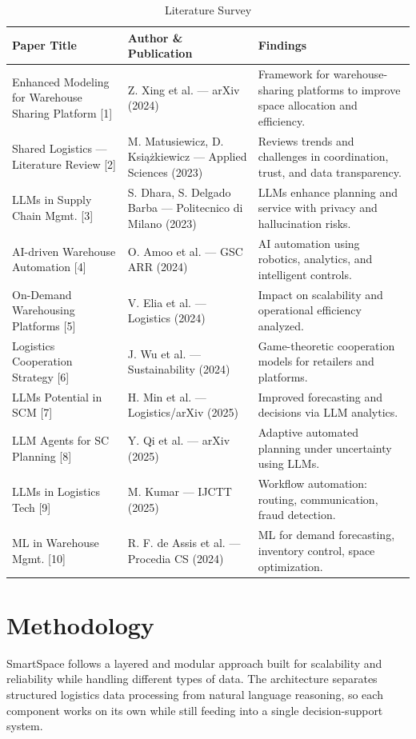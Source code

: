 \documentclass[conference]{IEEEtran}
\begin{document}
\begin{table}[!htbp]
\caption{Literature Survey}
\label{tab:literature_survey}
\centering
\footnotesize
\renewcommand{\arraystretch}{1.2}
\setlength{\tabcolsep}{3pt}
\begin{tabularx}{\columnwidth}{|p{}|p{}|p{}|}
\hline
\textbf{Paper Title} & \textbf{Author \& Publication} & \textbf{Findings} \\
\hline
Enhanced Modeling for Warehouse Sharing Platform [1]
& Z. Xing et al. --- arXiv (2024)
& Framework for warehouse-sharing platforms to improve space allocation and efficiency. \\
\hline
Shared Logistics --- Literature Review [2]
& M. Matusiewicz, D. Ksi\k{a}\.zkiewicz --- Applied Sciences (2023)
& Reviews trends and challenges in coordination, trust, and data transparency. \\
\hline
LLMs in Supply Chain Mgmt. [3]
& S. Dhara, S. Delgado Barba --- Politecnico di Milano (2023)
& LLMs enhance planning and service with privacy and hallucination risks. \\
\hline
AI-driven Warehouse Automation [4]
& O. Amoo et al. --- GSC ARR (2024)
& AI automation using robotics, analytics, and intelligent controls. \\
\hline
On-Demand Warehousing Platforms [5]
& V. Elia et al. --- Logistics (2024)
& Impact on scalability and operational efficiency analyzed. \\
\hline
Logistics Cooperation Strategy [6]
& J. Wu et al. --- Sustainability (2024)
& Game-theoretic cooperation models for retailers and platforms. \\
\hline
LLMs Potential in SCM [7]
& H. Min et al. --- Logistics/arXiv (2025)
& Improved forecasting and decisions via LLM analytics. \\
\hline
LLM Agents for SC Planning [8]
& Y. Qi et al. --- arXiv (2025)
& Adaptive automated planning under uncertainty using LLMs. \\
\hline
LLMs in Logistics Tech [9]
& M. Kumar --- IJCTT (2025)
& Workflow automation: routing, communication, fraud detection. \\
\hline
ML in Warehouse Mgmt. [10]
& R. F. de Assis et al. --- Procedia CS (2024)
& ML for demand forecasting, inventory control, space optimization. \\
\hline
\end{tabularx}
\end{table}

\section{Methodology}
SmartSpace follows a layered and modular approach built for scalability and reliability while handling different types of data. The architecture separates structured logistics data processing from natural language reasoning, so each component works on its own while still feeding into a single decision-support system.
\end{document}
